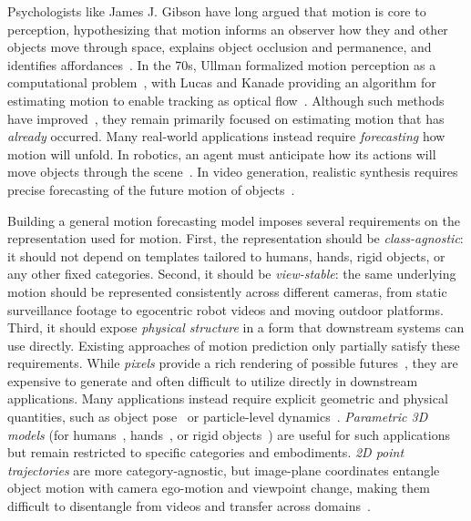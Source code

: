 \documentclass{llmxive}
\begin{document}
Psychologists like James J. Gibson have long argued that motion is core to perception, hypothesizing that motion informs an observer how they and other objects move through space, explains object occlusion and permanence, and identifies affordances~\cite{gibson2014ecological}. In the 70s, Ullman formalized motion perception as a computational problem~\cite{ullman1979interpretation}, with Lucas and Kanade providing an algorithm for estimating motion to enable tracking as optical flow~\cite{lucas1981iterative}. Although such methods have improved~\cite{raft, doersch2022tapvid, cotracker3}, they remain primarily focused on estimating motion that has \textit{already} occurred. Many real-world applications instead require \emph{forecasting} how motion will unfold. In robotics, an agent must anticipate how its actions will move objects through the scene~\cite{finn2017deepvisualforesight, track2act}. In video generation, realistic synthesis requires precise forecasting of the future motion of objects~\cite{nvidia2025cosmos, bruce2024genie}. 


Building a general motion forecasting model imposes several requirements on the representation used for motion. First, the representation should be \textit{class-agnostic}: it should not depend on templates tailored to humans, hands, rigid objects, or any other fixed categories. Second, it should be \textit{view-stable}: the same underlying motion should be represented consistently across different cameras, from static surveillance footage to egocentric robot videos and moving outdoor platforms. Third, it should expose \textit{physical structure} in a form that downstream systems can use directly. 
Existing approaches of motion prediction only partially satisfy these requirements. While \textit{pixels} provide a rich rendering of possible futures~\cite{wan22, nvidia2025cosmos, bruce2024genie}, they are expensive to generate and often difficult to utilize directly in downstream applications.
Many applications instead require explicit geometric and physical quantities, such as object pose~\cite{traj2action, wen2023bundlesdf, vidbot} or particle-level dynamics~\cite{li2018particledynamics, sanchez2020graphnetworksimulators}.
\textit{Parametric 3D models} (for humans~\cite{chen2023humanmac}, hands~\cite{bi2025hrdthumanmanipulationenhanced}, or rigid objects~\cite{soraki2026objectforesightpredictingfuture3d}) are useful for such applications but remain restricted to specific categories and embodiments. 
\textit{2D point trajectories} are more category-agnostic, but image-plane coordinates entangle object motion with camera ego-motion and viewpoint change, making them difficult to disentangle from videos and transfer across domains~\cite{track2act, thakkar2026forecastingmotion}. 
\end{document}
